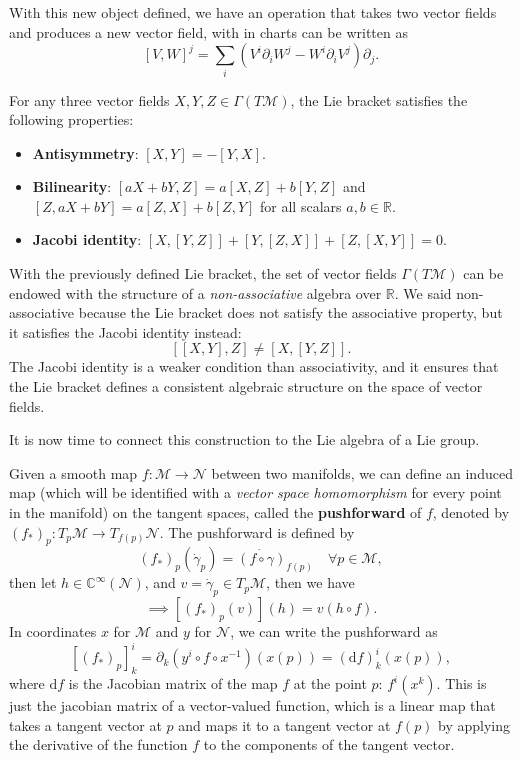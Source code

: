 With this new object defined, we have an operation that takes two vector fields and produces a new vector field, with in charts can be written as
\[
    [V, W]^j = \sum_{i} \left( V^i \partial_i W^j - W^i \partial_i V^j \right) \partial_j.
\]

\begin{proposition}
    For any three vector fields \(X, Y, Z \in \Gamma(T\mathcal{M})\), the Lie bracket satisfies the following properties:
    \begin{itemize}
        \item \textbf{Antisymmetry}: \([X, Y] = -[Y, X]\).
        \item \textbf{Bilinearity}: \([aX + bY, Z] = a[X, Z] + b[Y, Z]\) and \([Z, aX + bY] = a[Z, X] + b[Z, Y]\) for all scalars \(a, b \in \mathbb{R}\).
        \item \textbf{Jacobi identity}: \([X, [Y, Z]] + [Y, [Z, X]] + [Z, [X, Y]] = 0\).
    \end{itemize}
\end{proposition}

\begin{corollary}
    With the previously defined Lie bracket, the set of vector fields \(\Gamma(T\mathcal{M})\) can be endowed with the structure of a \textit{non-associative} algebra over \(\mathbb{R}\). We said non-associative because the Lie bracket does not satisfy the associative property, but it satisfies the Jacobi identity instead:
    \[
        [[X,Y],Z] \neq [X,[Y,Z]].
    \]
    The Jacobi identity is a weaker condition than associativity, and it ensures that the Lie bracket defines a consistent algebraic structure on the space of vector fields.
\end{corollary}

It is now time to connect this construction to the Lie algebra of a Lie group.

\begin{definition}
    Given a smooth map \(f : \mathcal{M} \to \mathcal{N}\) between two manifolds, we can define an induced map (which will be identified with a \textit{vector space homomorphism} for every point in the manifold) on the tangent spaces, called the \textbf{pushforward} of \(f\), denoted by \((f_*)_p : T_p \mathcal{M} \to T_{f(p)} \mathcal{N}\). The pushforward is defined by
    \[
        (f_*)_p (\dot{\gamma}_p) = \dot{(f \circ \gamma)}_{f(p)} \quad \forall p \in \mathcal{M},
    \]
    then let \(h \in \mathbb{C}^{\infty}(\mathcal{N})\), and \(v = \dot{\gamma}_p \in T_p\mathcal{M}\), then we have
    \[
        \implies \left[(f_*)_p(v)\right](h) = v(h \circ f).
    \]
    In coordinates \(x\) for \(\mathcal{M}\) and \(y\) for \(\mathcal{N}\), we can write the pushforward as
    \[
        [(f_*)_p]^i_k = \partial_k (y^i \circ f \circ x^{-1})(x(p)) = (\mathrm{d} f)^i_k (x(p)),
    \]
    where \(\mathrm{d} f\) is the Jacobian matrix of the map \(f\) at the point \(p\): \(f^i(x^k)\). This is just the jacobian matrix of a vector-valued function, which is a linear map that takes a tangent vector at \(p\) and maps it to a tangent vector at \(f(p)\) by applying the derivative of the function \(f\) to the components of the tangent vector.
\end{definition}

